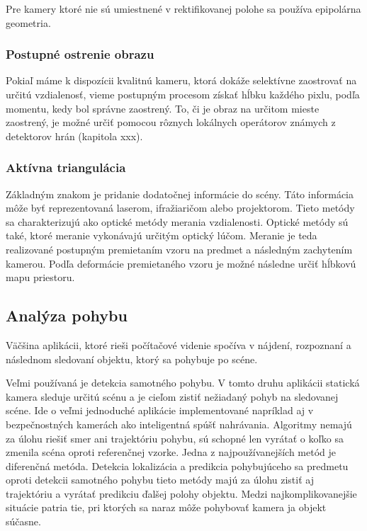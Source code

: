 Pre kamery ktoré nie sú umiestnené v rektifikovanej  polohe sa používa epipolárna geometria. 


\subsubsection{Postupné ostrenie obrazu }
Pokiaľ máme k dispozícii kvalitnú kameru, ktorá dokáže selektívne zaostrovať na určitú vzdialenosť, vieme postupným procesom získať hĺbku každého pixlu, podľa momentu, kedy bol správne zaostrený. To, či je obraz na určitom mieste zaostrený, je možné určiť pomocou rôznych lokálnych operátorov známych z detektorov hrán (kapitola xxx). 


\subsubsection{Aktívna triangulácia }
Základným znakom je pridanie dodatočnej informácie do scény. Táto informácia môže byť reprezentovaná laserom, ifražiaričom alebo projektorom. Tieto metódy sa charakterizujú ako optické metódy merania vzdialenosti. Optické metódy sú také, ktoré meranie vykonávajú určitým optický lúčom.  Meranie je teda realizované postupným premietaním vzoru na predmet a následným zachytením kamerou. Podľa deformácie premietaného vzoru je možné následne určiť hĺbkovú mapu priestoru.

\subsection{Analýza pohybu }
Väčšina aplikácii, ktoré rieši počítačové videnie spočíva v nájdení, rozpoznaní a následnom sledovaní objektu, ktorý sa pohybuje po scéne. 

Veľmi používaná je detekcia samotného pohybu. V tomto druhu aplikácii statická kamera sleduje určitú scénu a je cieľom zistiť nežiadaný pohyb na sledovanej scéne. Ide o veľmi jednoduché aplikácie implementované napríklad aj v bezpečnostných kamerách ako inteligentná spúšť nahrávania.  Algoritmy nemajú za úlohu riešiť smer ani trajektóriu pohybu, sú schopné len vyrátať o koľko sa zmenila scéna oproti referenčnej vzorke. Jedna z najpoužívanejších metód je diferenčná metóda. Detekcia lokalizácia a predikcia pohybujúceho sa predmetu oproti detekcii samotného pohybu tieto metódy majú  za úlohu zistiť aj trajektóriu a vyrátať predikciu ďalšej polohy objektu. Medzi najkomplikovanejšie situácie patria tie, pri ktorých sa naraz môže pohybovať kamera ja objekt súčasne.


